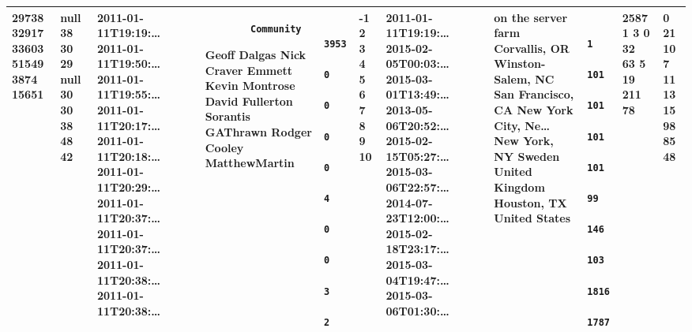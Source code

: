\documentclass[12pt,a4paper,twoside,openright,titlepage,final]{article}
\begin{document}
\begin{longtable}[]{@{}lllllllllll@{}}
\begin{minipage}[t]{0.05\columnwidth}
		29738 32917 33603 51549 3874 15651
		\strut\end{minipage} &
	\begin{minipage}[t]{0.03\columnwidth}\raggedright\strut
		null 38 30 29 null 30 30 38 48 42
		\strut\end{minipage} &
	\begin{minipage}[t]{0.11\columnwidth}\raggedright\strut
		2011-01-11T19:19:\ldots{} 2011-01-11T19:50:\ldots{}
		2011-01-11T19:55:\ldots{} 2011-01-11T20:17:\ldots{}
		2011-01-11T20:18:\ldots{} 2011-01-11T20:29:\ldots{}
		2011-01-11T20:37:\ldots{} 2011-01-11T20:37:\ldots{}
		2011-01-11T20:38:\ldots{} 2011-01-11T20:38:\ldots{}
		\strut\end{minipage} &
	\begin{minipage}[t]{0.08\columnwidth}\raggedright\strut
		\begin{verbatim}
		Community
		\end{verbatim}
		
		Geoff Dalgas Nick Craver Emmett Kevin Montrose David Fullerton Sorantis
		GAThrawn Rodger Cooley MatthewMartin
		\strut\end{minipage} &
	\begin{minipage}[t]{0.05\columnwidth}\raggedright\strut
		\begin{verbatim}
		3953
		0
		0
		0
		0
		4
		0
		0
		3
		2
		\end{verbatim}
		\strut\end{minipage} &
	\begin{minipage}[t]{0.02\columnwidth}\raggedright\strut
		-1 2 3 4 5 6 7 8 9 10
		\strut\end{minipage} &
	\begin{minipage}[t]{0.11\columnwidth}\raggedright\strut
		2011-01-11T19:19:\ldots{} 2015-02-05T00:03:\ldots{}
		2015-03-01T13:49:\ldots{} 2013-05-06T20:52:\ldots{}
		2015-02-15T05:27:\ldots{} 2015-03-06T22:57:\ldots{}
		2014-07-23T12:00:\ldots{} 2015-02-18T23:17:\ldots{}
		2015-03-04T19:47:\ldots{} 2015-03-06T01:30:\ldots{}
		\strut\end{minipage} &
	\begin{minipage}[t]{0.11\columnwidth}\raggedright\strut
		on the server farm Corvallis, OR Winston-Salem, NC San Francisco, CA New
		York City, Ne\ldots{} New York, NY Sweden United Kingdom Houston, TX
		United States
		\strut\end{minipage} &
	\begin{minipage}[t]{0.06\columnwidth}\raggedright\strut
		\begin{verbatim}
		1
		101
		101
		101
		101
		99
		146
		103
		1816
		1787
		\end{verbatim}
		\strut\end{minipage} &
	\begin{minipage}[t]{0.04\columnwidth}\raggedright\strut
		2587 1 3 0 32 63 5 19 211 78
		\strut\end{minipage} &
	\begin{minipage}[t]{0.04\columnwidth}\raggedright\strut
		0 21 10 7 11 13 15 98 85 48
		\strut\end{minipage}\tabularnewline
	\bottomrule
\end{longtable}
\end{document}
